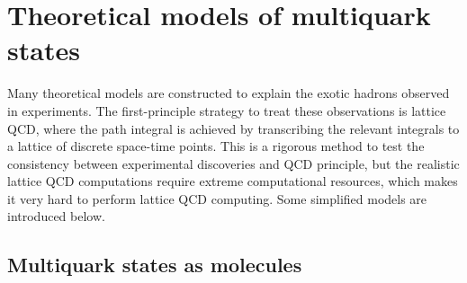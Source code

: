 
%
%
%
%



\section{Theoretical models of multiquark states}

Many theoretical models are constructed to explain the exotic hadrons observed in experiments\supercite{LIU2019237}.
The first-principle strategy to treat these observations is lattice QCD,
where the path integral is achieved by transcribing the relevant integrals to a lattice of discrete space-time points.
This is a rigorous method to test the consistency between experimental discoveries and QCD principle,
but the realistic lattice QCD computations require extreme computational resources,
which makes it very hard to perform lattice QCD computing.
Some simplified models are introduced below.


\subsection{Multiquark states as molecules}

